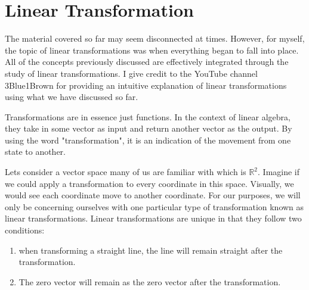 \documentclass[12pt]{book}
\begin{document}
	\section{Linear Transformation}
	The material covered so far may seem disconnected at times. However, for myself, the topic of linear transformations was when everything began to fall into place. All of the concepts previously discussed are effectively integrated through the study of linear transformations. I give credit to the YouTube channel 3Blue1Brown for providing an intuitive explanation of linear transformations using what we have discussed so far.
	
	Transformations are in essence just functions. In the context of linear algebra, they take in some vector as input and return another vector as the output. By using the word "transformation", it is an indication of the movement from one state to another. 
	
	Lets consider a vector space many of us are familiar with which is $\mathbb{R}^2$. Imagine if we could apply a transformation to every coordinate in this space. Visually, we would see each coordinate move to another coordinate. For our purposes, we will only be concerning ourselves with one particular type of transformation known as linear transformations. Linear transformations are unique in that they follow two conditions:
	
	\begin{enumerate}
		\item when transforming a straight line, the line will remain straight after the transformation.
		\item The zero vector will remain as the zero vector after the transformation. 
	\end{enumerate}
	
\end{document}
